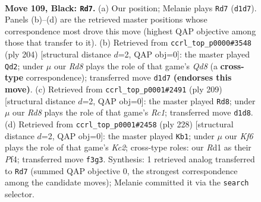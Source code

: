 \documentclass[11pt]{article}
\begin{document}
\clearpage

\begin{figure}[p]\centering
\begin{subfigure}{0.46\textwidth}\centering
\resizebox{\linewidth}{!}{%
\newchessgame
\chessboard[
  setfen={8/8/8/7K/8/5k2/8/3r4 b - - 3 109},
  showmover=false,
  pgfstyle=straightmove, color=movearrow, markmove={d1-d7}
]}
\caption{}
\end{subfigure}\hfill
\begin{subfigure}{0.46\textwidth}\centering
\resizebox{\linewidth}{!}{%
\newchessgame
\chessboard[
  setfen={3Q4/8/8/8/2K5/k7/8/8 w - - 6 103},
  showmover=false,
  pgfstyle=straightmove, color=movearrow, markmove={d8-d2}
]}
\caption{}
\end{subfigure}
\\[4pt]
\begin{subfigure}{0.46\textwidth}\centering
\resizebox{\linewidth}{!}{%
\newchessgame
\chessboard[
  setfen={2r5/4k3/8/8/K7/8/3N4/8 b - - 5 105},
  showmover=false,
  pgfstyle=straightmove, color=movearrow, markmove={c8-d8}
]}
\caption{}
\end{subfigure}\hfill
\begin{subfigure}{0.46\textwidth}\centering
\resizebox{\linewidth}{!}{%
\newchessgame
\chessboard[
  setfen={8/8/8/2k5/5P2/8/2K5/8 w - - 0 115},
  showmover=false,
  pgfstyle=straightmove, color=movearrow, markmove={c2-b1}
]}
\caption{}
\end{subfigure}
\caption{\textbf{Move 109, Black: \texttt{Rd7}.} (a) Our position; Melanie plays \texttt{Rd7} (\texttt{d1d7}). Panels (b)--(d) are the retrieved master positions whose correspondence most drove this move (highest QAP objective among those that transfer to it). (b) Retrieved from \texttt{ccrl\_top\_p0000\#3548} (ply 204) [structural distance $d$=2, QAP obj=0]: the master played \texttt{Qd2}; under $\mu$ our \emph{Rd8} plays the role of that game's \emph{Qd8} (a \textbf{cross-type} correspondence); transferred move \texttt{d1d7} \textbf{(endorses this move)}. (c) Retrieved from \texttt{ccrl\_top\_p0001\#2491} (ply 209) [structural distance $d$=2, QAP obj=0]: the master played \texttt{Rd8}; under $\mu$ our \emph{Rd8} plays the role of that game's \emph{Rc1}; transferred move \texttt{d1d8}. (d) Retrieved from \texttt{ccrl\_top\_p0001\#2458} (ply 228) [structural distance $d$=2, QAP obj=0]: the master played \texttt{Kb1}; under $\mu$ our \emph{Kf6} plays the role of that game's \emph{Kc2}; cross-type roles: our \emph{R}d1 as their \emph{P}f4; transferred move \texttt{f3g3}. Synthesis: 1 retrieved analog transferred to \texttt{Rd7} (summed QAP objective 0, the strongest correspondence among the candidate moves); Melanie committed it via the \texttt{search} selector.}
\label{fig:thought-m217}
\end{figure}
\end{document}
